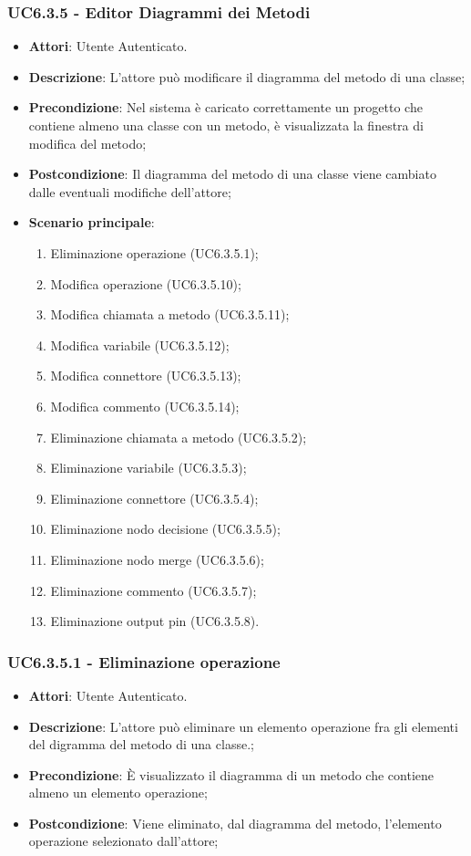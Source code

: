 \subsubsection{UC6.3.5 - Editor Diagrammi dei Metodi} 
\label{sssec:UC6.3.5} 
\begin{itemize} 
\item \textbf{Attori}: Utente Autenticato.
\item \textbf{Descrizione}: L'attore può modificare il diagramma del metodo di una classe;
\item \textbf{Precondizione}: Nel sistema è caricato correttamente un progetto che  contiene almeno una classe con un metodo, è visualizzata la finestra di modifica del metodo;
\item \textbf{Postcondizione}: Il diagramma del metodo di una classe viene cambiato dalle eventuali modifiche dell'attore;
\item \textbf{Scenario principale}: \begin{enumerate}\item Eliminazione operazione (UC6.3.5.1);\item Modifica operazione (UC6.3.5.10);\item Modifica chiamata a metodo (UC6.3.5.11);\item Modifica variabile (UC6.3.5.12);\item Modifica connettore (UC6.3.5.13);\item Modifica commento (UC6.3.5.14);\item Eliminazione chiamata a metodo (UC6.3.5.2);\item Eliminazione variabile (UC6.3.5.3);\item Eliminazione connettore (UC6.3.5.4);\item Eliminazione nodo decisione (UC6.3.5.5);\item Eliminazione nodo merge (UC6.3.5.6);\item Eliminazione commento (UC6.3.5.7);\item Eliminazione output pin (UC6.3.5.8). 
 \end{enumerate}
\end{itemize} 
\subsubsection{UC6.3.5.1 - Eliminazione operazione} 
\label{sssec:UC6.3.5.1} 
\begin{itemize} 
\item \textbf{Attori}: Utente Autenticato.
\item \textbf{Descrizione}: L'attore può eliminare un elemento operazione fra gli elementi del digramma del metodo di una classe.;
\item \textbf{Precondizione}: È visualizzato il diagramma di un metodo che contiene almeno un elemento operazione;
\item \textbf{Postcondizione}: Viene eliminato, dal diagramma del metodo,  l'elemento operazione selezionato dall'attore;
\end{itemize} 
